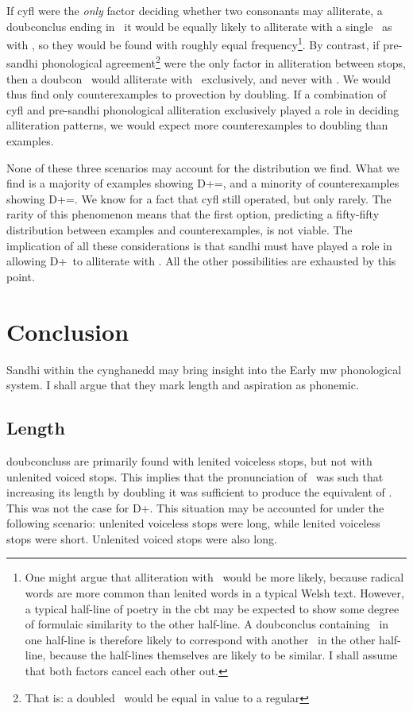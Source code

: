 If \gls{cyfl} were the \emph{only} factor deciding whether two consonants may alliterate, a \gls{doubconclus} ending in \lT\ it would be equally likely to alliterate with a single \lT\ as with \xT, so they would be found with  roughly equal frequency\footnote{One might argue that alliteration with \xT\ would be more likely, because radical words are more common than lenited words in a typical Welsh text. However, a typical half-line of poetry in the \gls{cbt} may be expected to show some degree of formulaic similarity to the other half-line. A \gls{doubconclus} containing \lT\ in one half-line is therefore likely to correspond with another \lT\ in the other half-line, because the half-lines themselves are likely to be similar. I shall assume that both factors cancel each other out.}.
By contrast, if pre-sandhi phonological agreement\footnote{That is: a doubled \lT\ would be equal in value to a regular \lT} were the only factor in alliteration between stops, then a \gls{doubcon} \lT\ would alliterate with \lT\ exclusively, and never with \xT. We would thus find only counterexamples to provection by doubling. If a combination of \gls{cyfl} and pre-sandhi phonological alliteration exclusively played a role in deciding alliteration patterns, we would expect more counterexamples to doubling than examples.

None of these three scenarios may account for the distribution we find. What we find is a majority of examples showing \gls{D}+\lT=\xT, and a minority of counterexamples showing \gls{D}+\lT=\lT. We know for a fact that \gls{cyfl} still operated, but only rarely. The rarity of this phenomenon means that the first option, predicting a fifty-fifty distribution between examples and counterexamples, is not viable. The implication of all these considerations is that sandhi must have played a role in allowing \gls{D}+\lT\ to alliterate with \xT. All the other possibilities are exhausted by this point. 

\section{Conclusion}
Sandhi within the cynghanedd may bring insight into the Early \gls{mw} phonological system. I shall argue that they mark length and aspiration as phonemic. 

\subsection{Length}
\Gls{doubconclus}s are primarily found with lenited voiceless stops, but not with unlenited voiced stops. This implies that the pronunciation of \lT\ was such that increasing its length by doubling it was sufficient to produce the equivalent of \xT. This was not the case for \gls{D}+\xD. This situation may be accounted for under the following scenario: unlenited voiceless stops were long, while lenited voiceless stops were short. Unlenited voiced stops were also long. 

